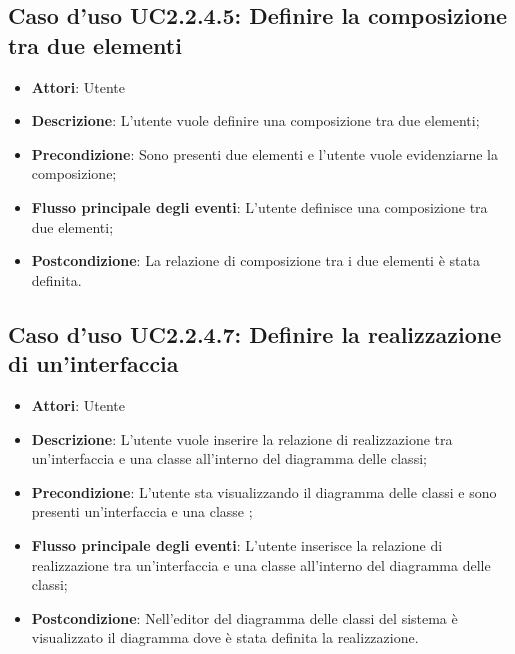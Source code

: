 \documentclass[../AnalisiDeiRequisiti.tex]{subfiles}
\begin{document}
			\subsection{Caso d'uso UC2.2.4.5: Definire la composizione tra due elementi}
			\begin{itemize}
				\item \textbf{Attori}: Utente
				\item \textbf{Descrizione}: L'utente vuole definire una composizione tra due elementi;
				\item \textbf{Precondizione}: Sono presenti due elementi e l'utente vuole evidenziarne la composizione;
				\item \textbf{Flusso principale degli eventi}: L'utente definisce una composizione tra due elementi;
				\item \textbf{Postcondizione}: La relazione di composizione tra i due elementi è stata definita.
			\end{itemize}
			\subsection{Caso d'uso UC2.2.4.7: Definire la realizzazione di un'interfaccia}
			\begin{itemize}
				\item \textbf{Attori}: Utente
				\item \textbf{Descrizione}: L'utente vuole inserire la relazione di realizzazione tra  un'interfaccia e una classe all'interno del diagramma delle classi;
				\item \textbf{Precondizione}: L'utente sta visualizzando il diagramma delle classi e sono presenti un'interfaccia e una classe ;
				\item \textbf{Flusso principale degli eventi}: L'utente inserisce la relazione di realizzazione tra  un'interfaccia e una classe all'interno del diagramma delle classi;
				\item \textbf{Postcondizione}: Nell'editor del diagramma delle classi del sistema è visualizzato il diagramma dove è stata definita la realizzazione.
			\end{itemize}
\end{document}

